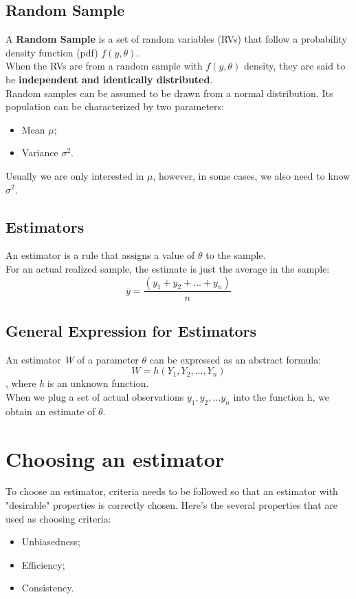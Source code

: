 \documentclass[11pt,a4paper]{report}
\begin{document}
\subsection{Random Sample}
A \textbf{Random Sample} is a set of random variables (RVs) that follow a probability density function (pdf) $f(y,\theta)$.
\\When the RVs are from a random sample with $f(y,\theta)$ density, they are said to be \textbf{independent and identically distributed}.
\\Random samples can be assumed to be drawn from a normal distribution. Its population can be characterized by two parameters:
\begin{itemize}
    \item Mean $\mu$;
    \item Variance $\sigma^2$.
\end{itemize}
Usually we are only interested in $\mu$, however, in some cases, we also need to know $\sigma^2$.
\subsection{Estimators}
An estimator is a rule that assigns a value of $\theta$ to the sample.
\\For an actual realized sample, the estimate is just the average in the sample:
\[\overline{y} = \frac{(y_1 + y_2 + ... + y_n)}{n}\]

\subsection{General Expression for Estimators}
An estimator \textit{W} of a parameter $\theta$ can be expressed as an abstract formula:
\[W = h(Y_1, Y_2, ..., Y_n)\], where \textit{h} is an unknown function.
\\When we plug a set of actual observations ${y_1, y_2, ... y_n}$ into the function h, we obtain an estimate of $\theta$.

\section{Choosing an estimator}
To choose an estimator, criteria needs to be followed so that an estimator with "desirable" properties is correctly chosen. Here's the several properties that are used as choosing criteria:
\begin{itemize}
    \item Unbiasedness;
    \item Efficiency;
    \item Consistency.
\end{itemize}
\end{document}
